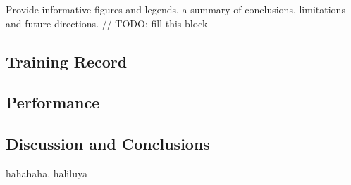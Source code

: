 \documentclass[letterpaper, 11pt]{article}
\begin{document}
\begin{multicols*}{2}
{
Provide informative figures and legends, a summary of conclusions, limitations and future directions.
\newline 
// TODO: fill this block
\subsection{Training Record}

\subsection{Performance}

\subsection{Discussion and Conclusions}
}
\end{multicols*}

\newpage
\begin{multicols*}{2}

\begin{thebibliography}{1}
hahahaha, haliluya
\end{thebibliography}

\end{multicols*}
\end{document}
